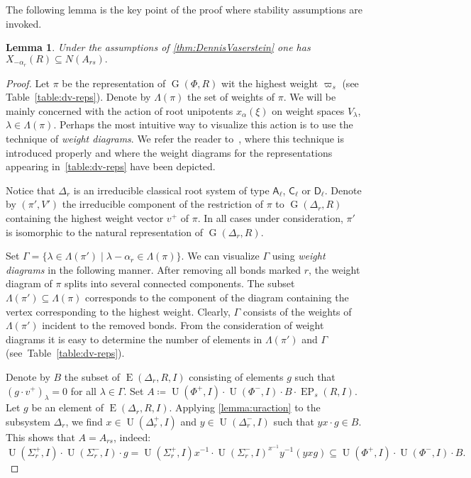 \documentclass[11pt]{amsart}
\theoremstyle{plain}
\numberwithin{equation}{section}
\newtheorem{lemma}{Lemma}
\numberwithin{lemma}{section}
\theoremstyle{definition}
\theoremstyle{remark}
\DeclareMathOperator{\G}{G}
\DeclareMathOperator{\E}{E}
\DeclareMathOperator{\EP}{EP}
\DeclareMathOperator{\U}{U}
\newcommand{\rA}{\mathsf{A}}
\newcommand{\rC}{\mathsf{C}}
\newcommand{\rD}{\mathsf{D}}
\begin{document}
The following lemma is the key point of the proof where stability assumptions are invoked.
\begin{lemma}\label{lemma:Stein_reduction}
Under the assumptions of \cref{thm:DennisVaserstein} one has $X_{-\alpha_r}(R) \subseteq N(A_{rs}).$
\end{lemma}
\begin{proof}
Let $\pi$ be the representation of $\G(\Phi, R)$ wit the highest weight $\varpi_s$ (see Table~\ref{table:dv-reps}).
Denote by $\Lambda(\pi)$ the set of weights of $\pi$.
We will be mainly concerned with the action of root unipotents $x_\alpha(\xi)$ on weight spaces $V_\lambda$, $\lambda \in \Lambda(\pi)$.
Perhaps the most intuitive way to visualize this action is to use the technique of {\it weight diagrams}.
We refer the reader to~\cite{PSV98}, where this technique is introduced properly and where the weight diagrams for the representations appearing in~\cref{table:dv-reps} have been depicted.

Notice that $\Delta_r$ is an irreducible classical root system of type $\rA_\ell$, $\rC_\ell$ or $\rD_\ell$.
Denote by $(\pi', V')$ the irreducible component of the restriction of $\pi$ to $\G(\Delta_r, R)$ containing the highest weight vector $v^+$ of $\pi$.
In all cases under consideration, $\pi'$ is isomorphic to the natural representation of $\G(\Delta_r, R)$.

Set $\Gamma = \{\lambda \in \Lambda(\pi') \mid \lambda - \alpha_r \in \Lambda(\pi) \}.$
We can visualize $\Gamma$ using {\it weight diagrams}  in the following manner.
After removing all bonds marked $r$, the weight diagram of $\pi$ splits into several connected components.
The subset $\Lambda(\pi') \subseteq \Lambda(\pi)$ corresponds to the component of the diagram containing the vertex corresponding to the highest weight.
Clearly, $\Gamma$ consists of the weights of $\Lambda(\pi')$ incident to the removed bonds.
From the consideration of weight diagrams it is easy to determine the number of elements in $\Lambda(\pi')$ and $\Gamma$ (see~Table~\ref{table:dv-reps}).

Denote by $B$ the subset of $\E(\Delta_r, R, I)$ consisting of elements $g$ such that $(g \cdot v^+)_\lambda = 0$ for all $\lambda\in\Gamma$.
Set $A\coloneqq\U(\Phi^+, I)\cdot \U(\Phi^-, I) \cdot B \cdot \EP_s(R, I).$
Let $g$ be an element of $\E(\Delta_r, R, I)$. Applying \cref{lemma:uraction} to the subsystem $\Delta_r$, we find
$x\in\U(\Delta_r^+, I)$ and $y\in \U(\Delta_r^-, I)$ such that $yx\cdot g \in B$.
This shows that $A = A_{rs}$, indeed:
\begin{equation*} \U(\Sigma^+_r, I) \cdot \U(\Sigma^-_r, I) \cdot g = \U(\Sigma^+_r, I) x^{-1} \cdot \U(\Sigma^-_r, I)^{x^{-1}} y^{-1} (yxg) \subseteq \U(\Phi^+, I) \cdot \U(\Phi^-, I) \cdot B. \end{equation*}


\end{proof}
\end{document}
